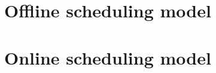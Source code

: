 \chapter{Offline scheduling model}
\label{sec:offline_scheduling_model}

\chapter{Online scheduling model}
\label{sec:online_scheduling_model}

